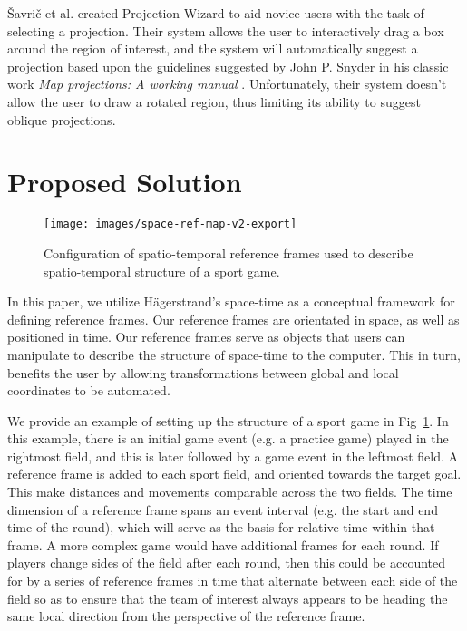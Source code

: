 Šavrič et al. created Projection Wizard \cite{savric_projection_2016} to aid novice users with the task of selecting a projection. Their system allows the user to interactively drag a box around the region of interest, and the system will automatically suggest a projection based upon the guidelines suggested by John P. Snyder in his classic work \textit{Map projections: A working manual} \cite{snyder_map_1987}. Unfortunately, their system doesn't allow the user to draw a rotated region, thus limiting its ability to suggest oblique projections.

\section{Proposed Solution}

\begin{figure}
\texttt{[image: images/space-ref-map-v2-export]}
\caption{Configuration of spatio-temporal reference frames used to describe spatio-temporal structure of a sport game.}
\label{fig:space-ref}
\end{figure}

In this paper, we utilize Hägerstrand's space-time as a conceptual framework for defining reference frames. Our reference frames are orientated in space, as well as positioned in time. Our reference frames serve as objects that users can manipulate to describe the structure of space-time to the computer. This in turn, benefits the user by allowing transformations between global and local coordinates to be automated.

We provide an example of setting up the structure of a sport game in Fig~\ref{fig:space-ref}. In this example, there is an initial game event (e.g. a practice game) played in the rightmost field, and this is later followed by a game event in the leftmost field. A reference frame is added to each sport field, and oriented towards the target goal. This make distances and movements comparable across the two fields. The time dimension of a reference frame spans an event interval (e.g. the start and end time of the round), which will serve as the basis for relative time within that frame. A more complex game would have additional frames for each round. If players change sides of the field after each round, then this could be accounted for by a series of reference frames in time that alternate between each side of the field so as to ensure that the team of interest always appears to be heading the same local direction from the perspective of the reference frame.









